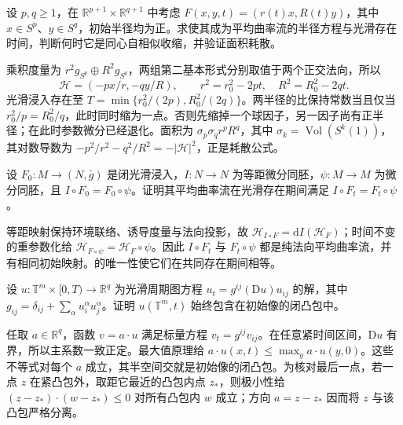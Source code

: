 \begin{exercise}\label{g3:ex:mcf-product-spheres}
	设 \(p,q\ge1\)，在 \(\mathbb R^{p+1}\times\mathbb R^{q+1}\) 中考虑 \(F(x,y,t)=(r(t)x,R(t)y)\)，其中 \(x\in S^p\)、\(y\in S^q\)，初始半径均为正。求使其成为平均曲率流的半径方程与光滑存在时间，判断何时它是同心自相似收缩，并验证面积耗散。
\end{exercise}
\begin{solution}
	乘积度量为 \(r^2g_{S^p}\oplus R^2g_{S^q}\)，两组第二基本形式分别取值于两个正交法向，所以
	\[
		\mathcal H=(-p x/r,-q y/R),\qquad
		r^2=r_0^2-2pt,\quad R^2=R_0^2-2qt.
	\]
	光滑浸入存在至 \(T=\min\{r_0^2/(2p),R_0^2/(2q)\}\)。两半径的比保持常数当且仅当 \(r_0^2/p=R_0^2/q\)，此时同时缩为一点。否则先缩掉一个球因子，另一因子尚有正半径；在此时参数微分已经退化。面积为 \(\sigma_p\sigma_q r^pR^q\)，其中 \(\sigma_k=\operatorname{Vol}(S^k(1))\)，其对数导数为 \(-p^2/r^2-q^2/R^2=-|\mathcal H|^2\)，正是耗散公式。
\end{solution}

\begin{exercise}\label{g3:ex:mcf-symmetry}
	设 \(F_0:M\to(N,\bar g)\) 是闭光滑浸入，\(I:N\to N\) 为等距微分同胚，\(\psi:M\to M\) 为微分同胚，且 \(I\circ F_0=F_0\circ\psi\)。证明其平均曲率流在光滑存在期间满足 \(I\circ F_t=F_t\circ\psi\)。
\end{exercise}
\begin{solution}
	等距映射保持环境联络、诱导度量与法向投影，故 \(\mathcal H_{I\circ F}=\mathrm dI(\mathcal H_F)\)；时间不变的重参数化给 \(\mathcal H_{F\circ\psi}=\mathcal H_F\circ\psi\)。因此 \(I\circ F_t\) 与 \(F_t\circ\psi\) 都是纯法向平均曲率流，并有相同初始映射。的唯一性使它们在共同存在期间相等。
\end{solution}

\begin{exercise}\label{g3:ex:mcf-periodic-convex-hull}
	设 \(u:\mathbb T^m\times[0,T)\to\mathbb R^q\) 为光滑周期图方程 \(u_t=g^{ij}(\mathrm Du)u_{ij}\) 的解，其中 \(g_{ij}=\delta_{ij}+\sum_\alpha u_i^\alpha u_j^\alpha\)。证明 \(u(\mathbb T^m,t)\) 始终包含在初始像的闭凸包中。
\end{exercise}
\begin{solution}
	任取 \(a\in\mathbb R^q\)，函数 \(v=a\cdot u\) 满足标量方程 \(v_t=g^{ij}v_{ij}\)。在任意紧时间区间，\(\mathrm Du\) 有界，所以主系数一致正定。最大值原理给 \(a\cdot u(x,t)\le\max_y a\cdot u(y,0)\)。这些不等式对每个 \(a\) 成立，其半空间交就是初始像的闭凸包。为核对最后一点，若一点 \(z\) 在紧凸包外，取距它最近的凸包内点 \(z_*\)，则极小性给 \((z-z_*)\cdot(w-z_*)\le0\) 对所有凸包内 \(w\) 成立；方向 \(a=z-z_*\) 因而将 \(z\) 与该凸包严格分离。
\end{solution}


